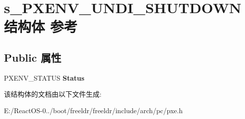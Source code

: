 \hypertarget{structs___p_x_e_n_v___u_n_d_i___s_h_u_t_d_o_w_n}{}\section{s\+\_\+\+P\+X\+E\+N\+V\+\_\+\+U\+N\+D\+I\+\_\+\+S\+H\+U\+T\+D\+O\+W\+N结构体 参考}
\label{structs___p_x_e_n_v___u_n_d_i___s_h_u_t_d_o_w_n}
\subsection*{Public 属性}
\begin{DoxyCompactItemize}
\item 
\mbox{\label{structs___p_x_e_n_v___u_n_d_i___s_h_u_t_d_o_w_n_abb1d528083fa7562e32fc8d13ee950ba}} 
P\+X\+E\+N\+V\+\_\+\+S\+T\+A\+T\+US {\bfseries Status}
\end{DoxyCompactItemize}


该结构体的文档由以下文件生成\+:\begin{DoxyCompactItemize}
\item 
E\+:/\+React\+O\+S-\/0../boot/freeldr/freeldr/include/arch/pc/pxe.\+h\end{DoxyCompactItemize}
